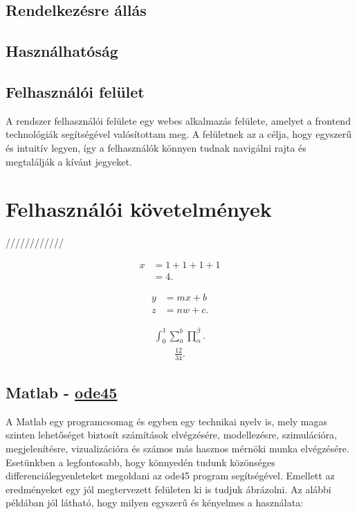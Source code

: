 \subsection {Rendelkezésre állás}

\subsection {Használhatóság}

\subsection {Felhasználói felület}

A rendszer felhasználói felülete egy webes alkalmazás felülete, amelyet a frontend technológiák segítségével valósítottam meg. A felületnek az a célja, hogy egyszerű és intuitív legyen, így a felhasználók könnyen tudnak navigálni rajta és megtalálják a kívánt jegyeket.


\section {Felhasználói követelmények}

////////////


	\begin{align}
	x&=1+1+1+1\\
	&=4.
\end{align}

	\begin{align}
	y&=mx+b\nonumber\\
	z&=nw+c.
\end{align}

			\begin{align}
	\int_0^1\sum_a^b\prod_\alpha^\beta.
\end{align}
	\begin{align*}
	\frac{12}{34}.
\end{align*}
\subsection {Matlab - \href{https://www.mathworks.com/help/matlab/ref/ode45.html}{ode45}} \label{MatlabOde45}

A Matlab egy programcsomag és egyben egy technikai nyelv is, mely magas szinten lehetőséget biztosít számítások elvégzésére, modellezésre, szimulációra, megjelenítésre, vizualizációra és számos más hasznos mérnöki munka elvégzésére. Esetünkben a legfontosabb, hogy könnyedén tudunk közönséges differenciálegyenleteket megoldani az ode45 program segítségével. Emellett az eredményeket egy jól megtervezett felületen ki is tudjuk ábrázolni. Az alábbi példában jól látható, hogy milyen egyszerű és kényelmes a használata:

